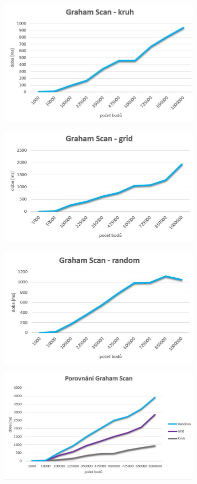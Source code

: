 \documentclass[a4paper, 12pt]{article}
\begin{document}
\begin{figure}[h!]
	\centering
	\includegraphics[width=10cm]{grahamscan_kruh.jpg}
\end{figure}


\begin{figure}[h!]
	\centering
	\includegraphics[width=10cm]{grahamscan_grid.jpg}
\end{figure}


\begin{figure}[h!]
	\centering
	\includegraphics[width=10cm]{grahamscan_random.jpg}
\end{figure}


\begin{figure}[h!]
	\centering
	\includegraphics[width=10cm]{graham_vse.jpg}
\end{figure}
\end{document}
